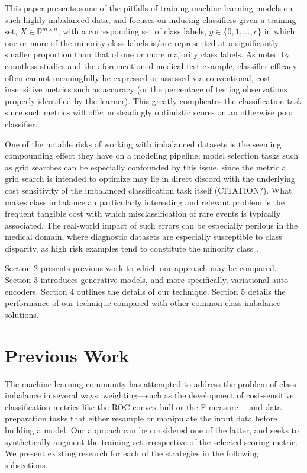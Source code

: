 \documentclass[twoside,11pt]{article}
\begin{document}
This paper presents some of the pitfalls of training machine learning models on such highly imbalanced data, and focuses on inducing classifiers given a training set, $X \in \mathbb{R}^{m \times n}$, with a corresponding set of class labels, $y \in \{0, 1, ..., c\}$ in which one or more of the minority class labels is/are represented at a significantly smaller proportion than that of one or more majority class labels. As noted by countless studies and the aforementioned medical test example, classifier efficacy often cannot meaningfully be expressed or assessed via conventional, cost-insensitive metrics such as accuracy (or the percentage of testing observations properly identified by the learner). This greatly complicates the classification task since such metrics will offer misleadingly optimistic scores on an otherwise poor classifier.

One of the notable risks of working with imbalanced datasets is the seeming compounding effect they have on a modeling pipeline; model selection tasks such as grid searches can be especially confounded by this issue, since the metric a grid search is intended to optimize may lie in direct discord with the underlying cost sensitivity of the imbalanced classification task itself (CITATION?). What makes class imbalance an particularly interesting and relevant problem is the frequent tangible cost with which misclassification of rare events is typically associated. The real-world impact of such errors can be especially perilous in the medical domain, where diagnostic datasets are especially susceptible to class disparity, as high risk examples tend to constitute the minority class \citep{rahman2013addressing}.

Section 2 presents previous work to which our approach may be compared. Section 3 introduces generative models, and more specifically, variational auto-encoders. Section 4 outlines the details of our technique. Section 5 details the performance of our technique compared with other common class imbalance solutions. \\

\section{Previous Work}

The machine learning community has attempted to address the problem of class imbalance in several ways: weighting---such as the development of cost-sensitive classification metrics like the ROC convex hull \citep{provost2001robust} or the F-measure \citep{lewis1994training}---and data preparation tasks that either resample or manipulate the input data before building a model. Our approach can be considered one of the latter, and seeks to synthetically augment the training set irrespective of the selected scoring metric. We present existing research for each of the strategies in the following subsections.
\end{document}
